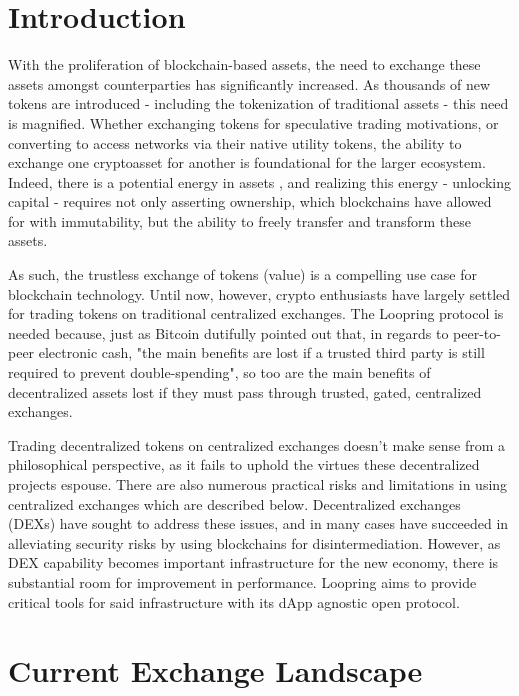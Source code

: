\documentclass[UTF8,nofonts]{article}
\begin{document}
\begin{multicols}{2}
\section{Introduction\label{sec:introduction}}

With the proliferation of blockchain-based assets, the need to exchange these assets amongst counterparties has significantly increased. As thousands of new tokens are introduced - including the tokenization of traditional assets - this need is magnified. Whether exchanging tokens for speculative trading motivations, or converting to access networks via their native utility tokens, the ability to exchange one cryptoasset for another is foundational for the larger ecosystem. Indeed, there is a potential energy in assets \cite{desotocapital}, and realizing this energy - unlocking capital - requires not only asserting ownership, which blockchains have allowed for with immutability,  but the ability to freely transfer and transform these assets.
 
As such, the trustless exchange of tokens (value) is a compelling use case for blockchain technology. Until now, however, crypto enthusiasts have largely settled for trading tokens on traditional centralized exchanges. The Loopring protocol is needed because, just as Bitcoin \cite{nakamoto2008bitcoin} dutifully pointed out that, in regards to peer-to-peer electronic cash, "the main benefits are lost if a trusted third party is still required to prevent double-spending", so too are the main benefits of decentralized assets lost if they must pass through trusted, gated, centralized exchanges.

Trading decentralized tokens on centralized exchanges doesn't make sense from a philosophical perspective, as it fails to uphold the virtues these decentralized projects espouse. There are also numerous practical risks and limitations in using centralized exchanges which are described below. Decentralized exchanges (DEXs) \cite{schuh2015bitshares} \cite{bancor} \cite{kyber} have sought to address these issues, and in many cases have succeeded in alleviating security risks by using blockchains for disintermediation. However, as DEX capability becomes important infrastructure for the new economy, there is substantial room for improvement in performance. Loopring aims to provide critical tools for said infrastructure with its dApp agnostic open protocol. 

\section{Current Exchange Landscape\label{sec:current_exchange_landscape}}


\end{multicols}
\end{document}
